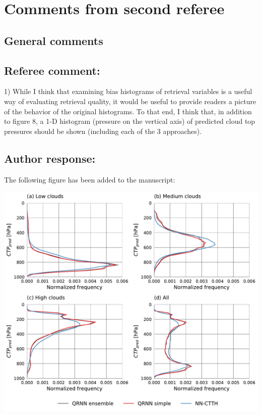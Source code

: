 \documentclass[journal abbreviation, manuscript]{copernicus}
\begin{document}
\section{Comments from second referee}

\subsection{General comments}

\subsection*{Referee comment:}

1) While I think that examining bias histograms of retrieval variables is a useful way
of  evaluating  retrieval quality,  it  would be  useful to  provide readers  a picture  of the
behavior of the original histograms.  To that end, I think that, in addition to figure 8, a
1-D histogram (pressure on the vertical axis) of predicted cloud top pressures should
be shown (including each of the 3 approaches).

\subsection*{Author response:}

The following figure has been added to the manuscript:

  \begin{center}
  \includegraphics[width = 0.8\linewidth]{../plots/fig09}
  \end{center}


\vspace{1em}
\end{document}
